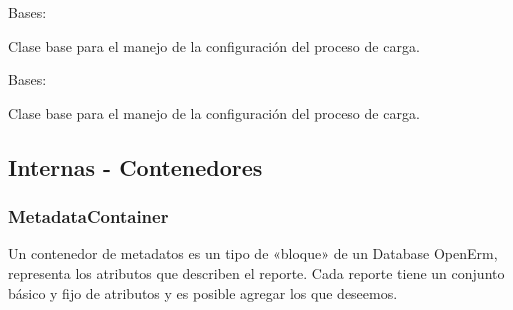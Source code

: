 \documentclass[a4paper,12pt,spanish]{sphinxmanual}
\begin{document}

\begin{fulllineitems}
\label{\detokenize{openerm.Config:openerm.Config.LoadConfig}}
Bases: {\hyperref[\detokenize{openerm.Config:openerm.Config.Config}]{}}

Clase base para el manejo de la configuración del proceso de carga.

\end{fulllineitems}


\begin{fulllineitems}
\label{\detokenize{openerm.Config:openerm.Config.ProcessorConfig}}
Bases: {\hyperref[\detokenize{openerm.Config:openerm.Config.Config}]{}}

Clase base para el manejo de la configuración del proceso de carga.

\end{fulllineitems}



\subsection{Internas - Contenedores}
\label{\detokenize{openerm:internas-contenedores}}\label{\detokenize{openerm.MetadataContainer:metadatacontainer}}\label{\detokenize{openerm.MetadataContainer:module-openerm.MetadataContainer}}\label{\detokenize{openerm.MetadataContainer:metadatacontainer}}

\subsubsection{MetadataContainer}
\label{\detokenize{openerm.MetadataContainer:id1}}\label{\detokenize{openerm.MetadataContainer::doc}}
Un contenedor de metadatos es un tipo de «bloque» de un Database OpenErm, representa
los atributos que describen el reporte. Cada reporte tiene un conjunto básico y fijo
de atributos y es posible agregar los que deseemos.
\end{document}
